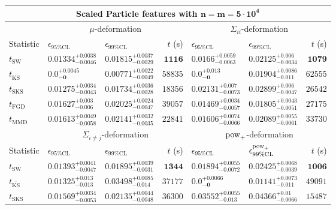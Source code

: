 \begin{tabular}{l|llr|llr}
	\toprule
	\multicolumn{7}{c}{{\bf Scaled Particle features with $\mathbf{n=m=5\cdot 10^{4}}$}} \\
	\toprule
	\multicolumn{1}{c}{} & \multicolumn{3}{c}{$\mu$-deformation} & \multicolumn{3}{c}{$\Sigma_{ii}$-deformation} \\
	Statistic & $\epsilon_{95\%\mathrm{CL}}$ & $\epsilon_{99\%\mathrm    {CL}}$ & $t$ (s) & $\epsilon_{95\%\mathrm{CL}}$ & $\epsilon_{99\%\mathrm{CL}}$ & $t$ (s) \\
	\midrule
	$t_{\mathrm{SW}}$ & $0.01334_{-0.0046}^{+0.0038}$ & $0.01815_{-0.0029}^{+0.0037}$ & ${\mathbf{1116}}$ & $0.0166_{-0.0063}^{+0.0059}$ & $0.02125_{-0.0034}^{+0.006}$ & ${\mathbf{1079}}$ \\
	$t_{\overline{\mathrm{KS}}}$ & ${\mathbf{0.0_{-0}^{+0.0045}}}$ & ${\mathbf{0.00771_{-0.0049}^{+0.0022}}}$ & $58835$ & ${\mathbf{0.0_{-0}^{+0.013}}}$ & $0.01904_{-0.011}^{+0.0086}$ & $62555$ \\
	$t_{\mathrm{SKS}}$ & $0.01275_{-0.0043}^{+0.0034}$ & $0.01734_{-0.0028}^{+0.0036}$ & $18356$ & $0.02131_{-0.0073}^{+0.007}$ & $0.02899_{-0.0047}^{+0.006}$ & $26542$ \\
	$t_{\mathrm{FGD}}$ & $0.01627_{-0.006}^{+0.003}$ & $0.02025_{-0.0047}^{+0.0024}$ & $39057$ & $0.01469_{-0.0057}^{+0.0034}$ & ${\mathbf{0.01805_{-0.0051}^{+0.0043}}}$ & $27175$ \\
	$t_{\mathrm{MMD}}$ & $0.01613_{-0.0058}^{+0.0049}$ & $0.02141_{-0.0035}^{+0.0032}$ & $22841$ & $0.01606_{-0.0066}^{+0.0074}$ & $0.02089_{-0.0061}^{+0.0055}$ & $33730$ \\
	\toprule
	\multicolumn{1}{c}{} & \multicolumn{3}{c}{$\Sigma_{i\neq j}$-deformation} & \multicolumn{3}{c}{$\rm{pow}_{+}$-deformation} \\
	Statistic & $\epsilon_{95\%\mathrm{CL}}$ & $\epsilon_{99\%\mathrm{CL}}$ & $t$ (s) & $\epsilon_{95\%\mathrm{CL}}$ & $\epsilon^{\rm   {pow}_{+}}_{99\%\mathrm{CL}}$ & $t$ (s) \\
	\midrule
	$t_{\mathrm{SW}}$ & $0.01393_{-0.0047}^{+0.0041}$ & $0.01895_{-0.0031}^{+0.0039}$ & ${\mathbf{1344}}$ & $0.01894_{-0.0072}^{+0.0055}$ & $0.02425_{-0.0039}^{+0.0068}$ & ${\mathbf{1006}}$ \\
	$t_{\overline{\mathrm{KS}}}$ & $0.01325_{-0.013}^{+0.013}$ & $0.03498_{-0.014}^{+0.0085}$ & $37177$ & ${\mathbf{0.0_{-0}^{+0.0066}}}$ & ${\mathbf{0.01141_{-0.011}^{+0.0073}}}$ & $49091$ \\
	$t_{\mathrm{SKS}}$ & $0.01569_{-0.0053}^{+0.0034}$ & $0.02135_{-0.0048}^{+0.0044}$ & $36300$ & $0.03552_{-0.013}^{+0.0055}$ & $0.04366_{-0.0066}^{+0.01}$ & $15487$ \\

\end{tabular}
